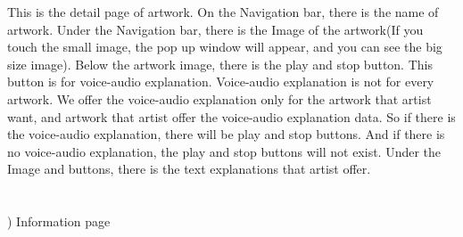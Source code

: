 \documentclass[conference]{IEEEtran}
\begin{document}
This is the detail page of artwork. On the Navigation bar, there is the name of artwork. Under the Navigation bar, there is the Image of the artwork(If you touch the small image, the pop up window will appear, and you can see the big size image). Below the artwork image, there is the play and stop button. This button is for voice-audio explanation. Voice-audio explanation is not for every artwork. We offer the voice-audio explanation only for the artwork that artist want, and artwork that artist offer the voice-audio explanation data. So if there is the voice-audio explanation, there will be play and stop buttons. And if there is no voice-audio explanation, the play and stop buttons will not exist. Under the Image and buttons, there is the text explanations that artist offer. \\\\\\
) Information page\\
\end{document}
